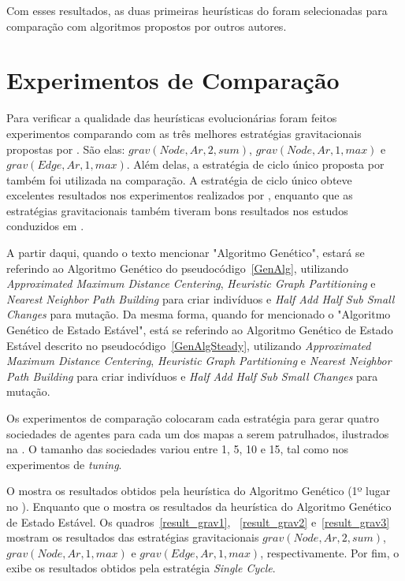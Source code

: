 Com esses resultados, as duas primeiras heurísticas do  foram 
selecionadas para comparação com algoritmos propostos por outros autores.

\section{Experimentos de Comparação}

Para verificar a qualidade das heurísticas evolucionárias foram feitos 
experimentos comparando com as três melhores estratégias gravitacionais 
propostas por \citep{sampaiophd}. São elas: $grav(Node,Ar,2,sum)$, 
$grav(Node,Ar,1,max)$ e $grav(Edge,Ar,1,max)$. Além delas, a estratégia de ciclo 
único proposta por \citep{Chevaleyre:2004:TAM:1018411.1019013} também foi 
utilizada na comparação. A estratégia de ciclo único obteve excelentes 
resultados nos experimentos realizados por \citep{Almeida:2004:AAI}, enquanto 
que as estratégias gravitacionais também tiveram bons resultados nos estudos 
conduzidos em \cite{sampaiophd}.

A partir daqui, quando o texto mencionar "Algoritmo Genético", estará se 
referindo ao Algoritmo Genético do pseudocódigo~\ref{GenAlg}, utilizando 
\textit{Approximated Maximum Distance Centering}, 
\textit{Heuristic Graph Partitioning} e \textit{Nearest Neighbor Path Building} 
para criar indivíduos e \textit{Half Add Half Sub Small Changes} para mutação.
Da mesma forma, quando for mencionado o "Algoritmo Genético de Estado Estável", 
está se referindo ao Algoritmo Genético de Estado Estável descrito no 
pseudocódigo~\ref{GenAlgSteady}, utilizando 
\textit{Approximated Maximum Distance Centering}, 
\textit{Heuristic Graph Partitioning} e \textit{Nearest Neighbor Path Building} 
para criar indivíduos e \textit{Half Add Half Sub Small Changes} para mutação.


Os experimentos de comparação colocaram cada estratégia para gerar quatro 
sociedades de agentes para cada um dos mapas a serem patrulhados, ilustrados na 
. O tamanho das sociedades variou entre 1, 5, 10 e 15, tal 
como nos experimentos de \textit{tuning}.

O  mostra os resultados obtidos pela heurística do 
Algoritmo Genético (1º lugar no ). Enquanto que o 
 mostra os resultados da heurística do Algoritmo 
Genético de Estado Estável. Os quadros~\ref{result_grav1}, ~\ref{result_grav2} 
e~\ref{result_grav3} mostram os resultados das estratégias gravitacionais 
$grav(Node,Ar,2,sum)$, $grav(Node,Ar,1,max)$ e $grav(Edge,Ar,1,max)$, 
respectivamente. Por fim, o  exibe os resultados obtidos 
pela estratégia \textit{Single Cycle}.

